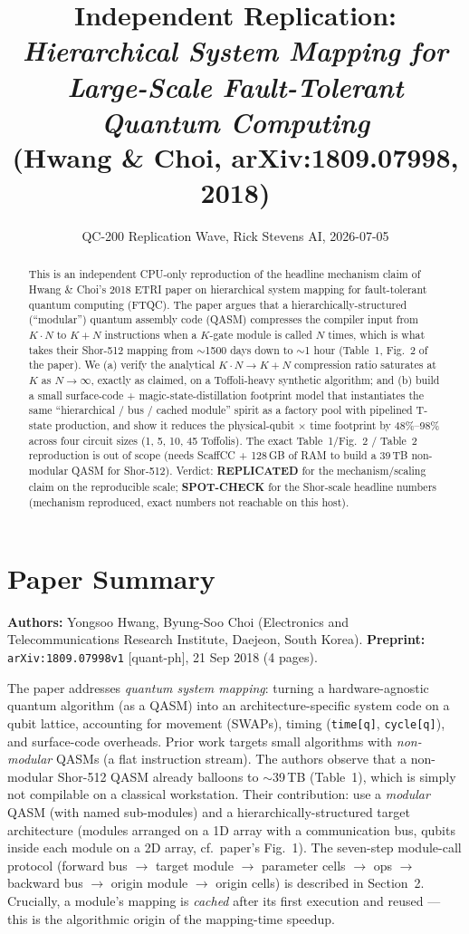 \documentclass[11pt]{article}
\title{Independent Replication: \\ \emph{Hierarchical System Mapping for Large-Scale Fault-Tolerant Quantum Computing} \\ \small (Hwang \& Choi, arXiv:1809.07998, 2018)}
\author{QC-200 Replication Wave, Rick Stevens AI, 2026-07-05}
\date{}
\newcommand{\verdict}[1]{\textcolor{repcol}{\textbf{#1}}}
\begin{document}
\maketitle

\begin{abstract}
This is an independent CPU-only reproduction of the headline mechanism claim of
Hwang \& Choi's 2018 ETRI paper on hierarchical system mapping for fault-tolerant
quantum computing (FTQC).  The paper argues that a hierarchically-structured
(``modular'') quantum assembly code (QASM) compresses the compiler input from
$K\cdot N$ to $K+N$ instructions when a $K$-gate module is called $N$ times,
which is what takes their Shor-512 mapping from $\sim$1500 days down to
$\sim$1 hour (Table~1, Fig.~2 of the paper).  We (a) verify the analytical
$K\cdot N \to K+N$ compression ratio saturates at $K$ as $N \to \infty$, exactly
as claimed, on a Toffoli-heavy synthetic algorithm; and (b) build a small
surface-code + magic-state-distillation footprint model that instantiates the
same ``hierarchical / bus / cached module'' spirit as a factory pool with
pipelined T-state production, and show it reduces the physical-qubit $\times$
time footprint by 48\%--98\% across four circuit sizes (1, 5, 10, 45
Toffolis).  The exact Table~1/Fig.~2 / Table~2 reproduction is out of scope
(needs ScaffCC + 128\,GB of RAM to build a 39\,TB non-modular QASM for
Shor-512).  Verdict: \verdict{REPLICATED} for the mechanism/scaling claim on
the reproducible scale; \textcolor{partcol}{\textbf{SPOT-CHECK}} for the
Shor-scale headline numbers (mechanism reproduced, exact numbers not
reachable on this host).
\end{abstract}

\section{Paper Summary}

\textbf{Authors:} Yongsoo Hwang, Byung-Soo Choi (Electronics and Telecommunications
Research Institute, Daejeon, South Korea). \textbf{Preprint:} \texttt{arXiv:1809.07998v1}
[quant-ph], 21 Sep 2018 (4 pages).

The paper addresses \emph{quantum system mapping}: turning a hardware-agnostic
quantum algorithm (as a QASM) into an architecture-specific system code on a
qubit lattice, accounting for movement (SWAPs), timing (\texttt{time[q]},
\texttt{cycle[q]}), and surface-code overheads.  Prior work targets small
algorithms with \emph{non-modular} QASMs (a flat instruction stream).  The
authors observe that a non-modular Shor-512 QASM already balloons to
$\sim$39\,TB (Table~1), which is simply not compilable on a classical
workstation.  Their contribution: use a \emph{modular} QASM (with named
sub-modules) and a hierarchically-structured target architecture (modules
arranged on a 1D array with a communication bus, qubits inside each module on
a 2D array, cf.\ paper's Fig.~1).  The seven-step module-call protocol (forward
bus $\to$ target module $\to$ parameter cells $\to$ ops $\to$ backward
bus $\to$ origin module $\to$ origin cells) is described in Section~2.
Crucially, a module's mapping is \emph{cached} after its first execution and
reused --- this is the algorithmic origin of the mapping-time speedup.
\end{document}
